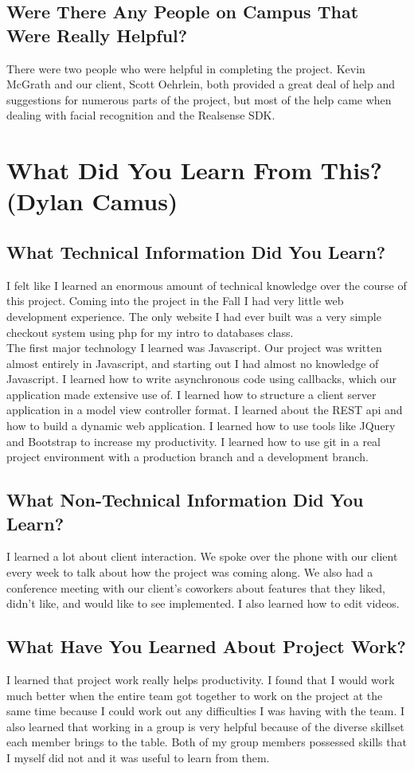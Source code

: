 \documentclass[10pt, onecolumn, twoside, peerreview]{IEEEtran}
\begin{document}
\subsection{Were There Any People on Campus That Were Really Helpful?}
There were two people who were helpful in completing the project. Kevin McGrath and our client, Scott Oehrlein, both provided a great deal of help and suggestions for numerous parts of the project, but most of the help came when dealing with facial recognition and the Realsense SDK.

\section{What Did You Learn From This? (Dylan Camus)}
\subsection{What Technical Information Did You Learn?}
I felt like I learned an enormous amount of technical knowledge over the course of this project. Coming into the project in the Fall I had very little web development experience. The only website I had ever built was a very simple checkout system using php for my intro to databases class.\\

The first major technology I learned was Javascript. Our project was written almost entirely in Javascript, and starting out I had almost no knowledge of Javascript. I learned how to write asynchronous code using callbacks, which our application made extensive use of. I learned how to structure a client server application in a model view controller format. I learned about the REST api and how to build a dynamic web application. I learned how to use tools like JQuery and Bootstrap to increase my productivity. I learned how to use git in a real project environment with a production branch and a development branch.

\subsection{What Non-Technical Information Did You Learn?}
I learned a lot about client interaction. We spoke over the phone with our client every week to talk about how the project was coming along. We also had a conference meeting with our client's coworkers about features that they liked, didn't like, and would like to see implemented. I also learned how to edit videos.

\subsection{What Have You Learned About Project Work?}
I learned that project work really helps productivity. I found that I would work much better when the entire team got together to work on the project at the same time because I could work out any difficulties I was having with the team. I also learned that working in a group is very helpful because of the diverse skillset each member brings to the table. Both of my group members possessed skills that I myself did not and it was useful to learn from them.
\end{document}
